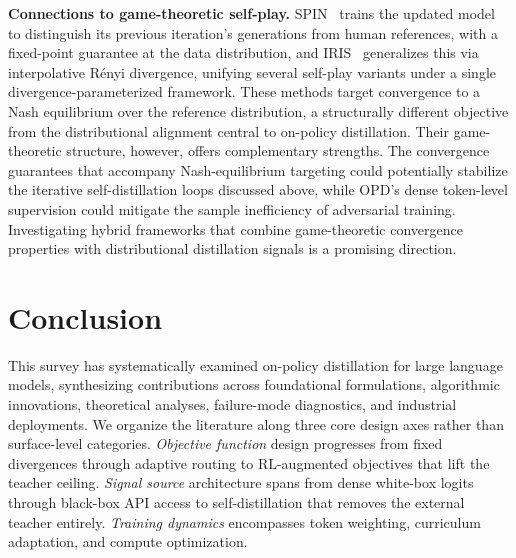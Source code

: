 \documentclass{article} %
\begin{document}
\textbf{Connections to game-theoretic self-play.} SPIN~\citep{2401.01335} trains the updated model to distinguish its previous iteration's generations from human references, with a fixed-point guarantee at the data distribution, and IRIS~\citep{2604.20933} generalizes this via interpolative R\'{e}nyi divergence, unifying several self-play variants under a single divergence-parameterized framework. These methods target convergence to a Nash equilibrium over the reference distribution, a structurally different objective from the distributional alignment central to on-policy distillation. Their game-theoretic structure, however, offers complementary strengths. The convergence guarantees that accompany Nash-equilibrium targeting could potentially stabilize the iterative self-distillation loops discussed above, while OPD's dense token-level supervision could mitigate the sample inefficiency of adversarial training. Investigating hybrid frameworks that combine game-theoretic convergence properties with distributional distillation signals is a promising direction.

\section{Conclusion}
\label{sec:conclusion}

This survey has systematically examined on-policy distillation for large language models, synthesizing contributions across foundational formulations, algorithmic innovations, theoretical analyses, failure-mode diagnostics, and industrial deployments. We organize the literature along three core design axes rather than surface-level categories. \emph{Objective function} design progresses from fixed divergences through adaptive routing to RL-augmented objectives that lift the teacher ceiling. \emph{Signal source} architecture spans from dense white-box logits through black-box API access to self-distillation that removes the external teacher entirely. \emph{Training dynamics} encompasses token weighting, curriculum adaptation, and compute optimization.
\end{document}
